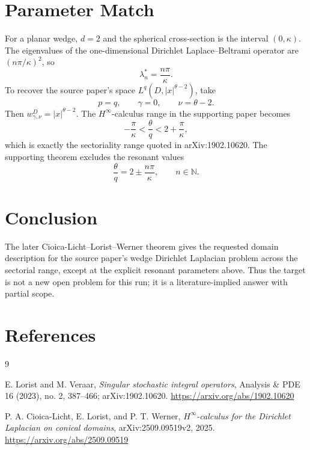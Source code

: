 \documentclass[11pt]{article}
\newcommand{\D}{D}
\begin{document}
\section*{Parameter Match}

For a planar wedge, \(d=2\) and the spherical cross-section is the interval
\((0,\kappa)\).  The eigenvalues of the one-dimensional Dirichlet
Laplace--Beltrami operator are \((n\pi/\kappa)^2\), so
\[
  \lambda_n^*=\frac{n\pi}{\kappa}.
\]
To recover the source paper's space \(L^q(\D,|x|^{\theta-2})\), take
\[
  p=q,\qquad \gamma=0,\qquad \nu=\theta-2.
\]
Then \(w_{\gamma,\nu}^{\D}=|x|^{\theta-2}\).  The \(H^\infty\)-calculus
range in the supporting paper becomes
\[
  -\frac{\pi}{\kappa}<\frac{\theta}{q}<2+\frac{\pi}{\kappa},
\]
which is exactly the sectoriality range quoted in arXiv:1902.10620.
The supporting theorem excludes the resonant values
\[
  \frac{\theta}{q}=2\pm \frac{n\pi}{\kappa},\qquad n\in\mathbb N.
\]

\section*{Conclusion}

The later Cioica-Licht--Lorist--Werner theorem gives the requested domain
description for the source paper's wedge Dirichlet Laplacian problem across
the sectorial range, except at the explicit resonant parameters above.  Thus
the target is not a new open problem for this run; it is a literature-implied
answer with partial scope.

\section*{References}

\begin{thebibliography}{9}

E. Lorist and M. Veraar,
\emph{Singular stochastic integral operators},
Analysis \& PDE 16 (2023), no. 2, 387--466;
arXiv:1902.10620.
\url{https://arxiv.org/abs/1902.10620}

P. A. Cioica-Licht, E. Lorist, and P. T. Werner,
\emph{\(H^\infty\)-calculus for the Dirichlet Laplacian on conical domains},
arXiv:2509.09519v2, 2025.
\url{https://arxiv.org/abs/2509.09519}

\end{thebibliography}
\end{document}
